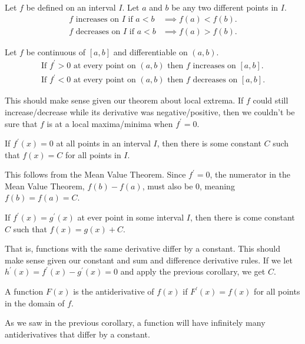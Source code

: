 \begin{definition}
	Let $f$ be defined on an interval $I$.
	Let $a$ and $b$ be any two different points in $I$.
	\begin{align*}
		\text{$f$ increases on $I$ if } a < b &\implies f(a) < f(b). \\
		\text{$f$ decreases on $I$ if } a < b &\implies f(a) > f(b).
	\end{align*}
\end{definition}

\begin{corollary}
	Let $f$ be continuous of $[a,b]$ and differentiable on $(a,b)$.
	\begin{align*}
		\text{If $f^\prime > 0$ at every point on $(a,b)$ then $f$ increases on $[a,b]$}. \\
		\text{If $f^\prime < 0$ at every point on $(a,b)$ then $f$ decreases on $[a,b]$}.
	\end{align*}
\end{corollary}
\noindent
This should make sense given our theorem about local extrema.
If $f$ could still increase/decrease while its derivative was negative/positive, then we couldn't be sure that $f$ is at a local maxima/minima when $f^\prime=0$.

\begin{corollary}
	If $f^\prime(x) = 0$ at all points in an interval $I$, then there is some constant $C$ such that $f(x) = C$ for all points in $I$.
\end{corollary}
\noindent
This follows from the Mean Value Theorem.
Since $f^\prime = 0$, the numerator in the Mean Value Theorem, $f(b) - f(a)$, must also be 0, meaning $f(b) = f(a) = C$.

\begin{corollary}
	If $f^\prime(x) = g^\prime(x)$ at ever point in some interval $I$, then there is come constant $C$ such that $f(x) = g(x) + C$.
\end{corollary}
\noindent
That is, functions with the same derivative differ by a constant.
This should make sense given our constant and sum and difference derivative rules.
If we let $h^\prime(x) = f^\prime(x) - g^\prime(x) = 0$ and apply the previous corollary, we get $C$.

\begin{definition}
	A function $F(x)$ is the antiderivative	of $f(x)$ if $F^\prime(x) = f(x)$ for all points in the domain of $f$.
\end{definition}
\noindent
As we saw in the previous corollary, a function will have infinitely many antiderivatives that differ by a constant.